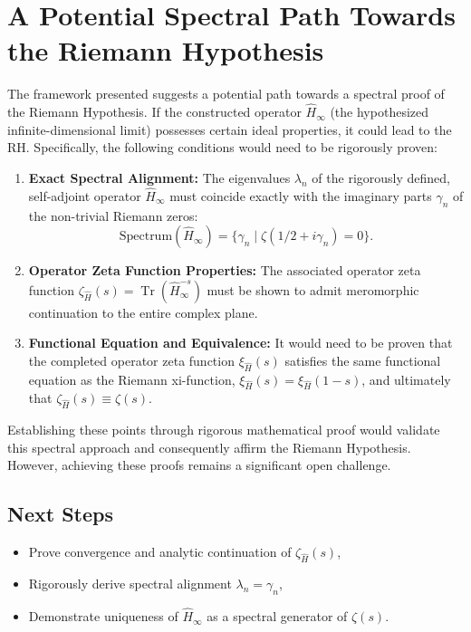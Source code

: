 \section{A Potential Spectral Path Towards the Riemann Hypothesis}
\vspace{10pt}

The framework presented suggests a potential path towards a spectral proof of the Riemann Hypothesis. If the constructed operator \( \hat{H}_\infty \) (the hypothesized infinite-dimensional limit) possesses certain ideal properties, it could lead to the RH. Specifically, the following conditions would need to be rigorously proven:
\begin{enumerate}
    \item \textbf{Exact Spectral Alignment:} The eigenvalues \( \lambda_n \) of the rigorously defined, self-adjoint operator \( \hat{H}_\infty \) must coincide exactly with the imaginary parts \( \gamma_n \) of the non-trivial Riemann zeros:
    \[
    \text{Spectrum}(\hat{H}_\infty) = \{ \gamma_n \mid \zeta(1/2 + i \gamma_n) = 0 \}.
    \]
    \item \textbf{Operator Zeta Function Properties:} The associated operator zeta function \( \zeta_{\hat{H}}(s) = \operatorname{Tr}(\hat{H}_\infty^{-s}) \) must be shown to admit meromorphic continuation to the entire complex plane.
    \item \textbf{Functional Equation and Equivalence:} It would need to be proven that the completed operator zeta function \( \xi_{\hat{H}}(s) \) satisfies the same functional equation as the Riemann xi-function, \( \xi_{\hat{H}}(s) = \xi_{\hat{H}}(1 - s) \), and ultimately that \( \zeta_{\hat{H}}(s) \equiv \zeta(s) \).
\end{enumerate}
Establishing these points through rigorous mathematical proof would validate this spectral approach and consequently affirm the Riemann Hypothesis. However, achieving these proofs remains a significant open challenge.

\subsection*{Next Steps}
\begin{itemize}
  \item Prove convergence and analytic continuation of \( \zeta_{\hat{H}}(s) \),
  \item Rigorously derive spectral alignment \( \lambda_n = \gamma_n \),
  \item Demonstrate uniqueness of \( \hat{H}_\infty \) as a spectral generator of \( \zeta(s) \).
\end{itemize}

